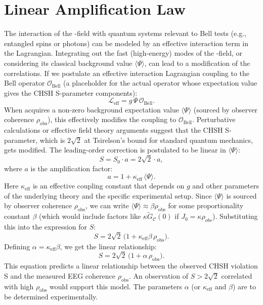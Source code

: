 \documentclass[11pt,a4paper]{article}
\newcommand{\PsiField}{\ensuremath{\Psi}}
\newcommand{\PropSpeed}{\ensuremath{\mathscr{C}}}
\newcommand{\Lagr}{\ensuremath{\mathcal{L}}}
\newcommand{\expval}[1]{\ensuremath{\langle#1\rangle}}
\begin{document}
\section{Linear Amplification Law}
\label{sec:linear-amplification}
The interaction of the \PsiFieldField-field with quantum systems relevant to Bell tests (e.g., entangled spins or photons) can be modeled by an effective interaction term in the Lagrangian. Integrating out the fast (high-energy) modes of the \PsiFieldField-field, or considering its classical background value $\expval{\PsiField}$, can lead to a modification of the correlations.
If we postulate an effective interaction Lagrangian coupling \PsiFieldField to the Bell operator $\mathcal{O}_{\text{Bell}}$ (a placeholder for the actual operator whose expectation value gives the CHSH S-parameter components):
\begin{equation}
    \Lagr_{\text{eff}} = g\,\PsiField\,\mathcal{O}_{\text{Bell}}.
\end{equation}
When \PsiFieldField acquires a non-zero background expectation value $\expval{\PsiField}$ (sourced by observer coherence $\rho_{\text{obs}}$), this effectively modifies the coupling to $\mathcal{O}_{\text{Bell}}$. Perturbative calculations or effective field theory arguments suggest that the CHSH S-parameter, which is $2\sqrt{2}$ at Tsirelson's bound for standard quantum mechanics, gets modified.
The leading-order correction is postulated to be linear in $\expval{\PsiField}$:
\begin{equation}
    S = S_0 \cdot a = 2\sqrt{2} \cdot a,
\end{equation}
where $a$ is the amplification factor:
\begin{equation}
    a = 1 + \kappa_{\text{eff}}\,\expval{\PsiField}.
\end{equation}
Here $\kappa_{\text{eff}}$ is an effective coupling constant that depends on $g$ and other parameters of the underlying theory and the specific experimental setup.
Since $\expval{\PsiField}$ is sourced by observer coherence $\rho_{\text{obs}}$, we can write $\expval{\PsiField} \approx \beta \rho_{\text{obs}}$ for some proportionality constant $\beta$ (which would include factors like $\kappa \tilde{G}_{\PropSpeed}(0)$ if $J_0 = \kappa \rho_{obs}$).
Substituting this into the expression for $S$:
\begin{equation}
    S = 2\sqrt{2}\,\bigl(1 + \kappa_{\text{eff}}\beta\,\rho_{\text{obs}}\bigr).
\end{equation}
Defining $\alpha = \kappa_{\text{eff}}\beta$, we get the linear relationship:
\begin{equation}
    S = 2\sqrt{2}\,\bigl(1 + \alpha\,\rho_{\text{obs}}\bigr).
\end{equation}
This equation predicts a linear relationship between the observed CHSH violation S and the measured EEG coherence $\rho_{\text{obs}}$. An observation of $S > 2\sqrt{2}$ correlated with high $\rho_{\text{obs}}$ would support this model. The parameters $\alpha$ (or $\kappa_{\text{eff}}$ and $\beta$) are to be determined experimentally.
\end{document}
